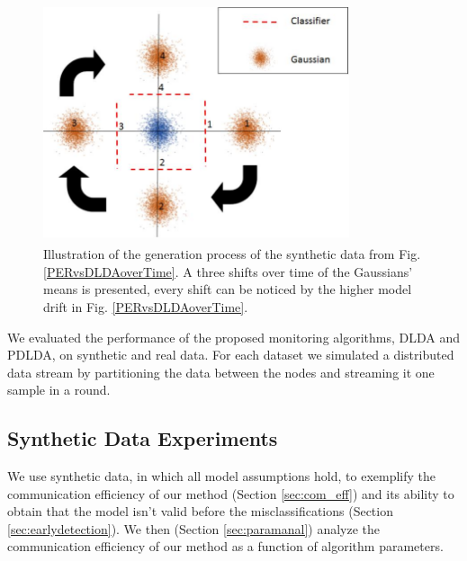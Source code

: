 \documentclass{vldb}
\begin{document}
\begin{figure}[ht]
	\centering
	\includegraphics[width=9cm, height=7cm]{graphics/DataShiftInEarlyDetection.jpg}
	\caption{Illustration of the generation process of the synthetic data from Fig. \ref{PERvsDLDAoverTime}. A three shifts over time of the Gaussians' means is presented, every shift can be noticed by the higher model drift in Fig. \ref{PERvsDLDAoverTime}.}
	\label{DataShiftInEarlyDetection}
\end{figure}

We evaluated the performance of the proposed monitoring algorithms, DLDA and PDLDA, on synthetic and real data. For each dataset we simulated a distributed data stream by partitioning the data between the nodes and streaming it one sample in a round. 

\subsection{Synthetic Data Experiments}
We use synthetic data, in which all model assumptions hold, to
exemplify the communication efficiency of our method (Section \ref{sec:com_eff})
and its ability to obtain that the model isn't valid before the
misclassifications (Section \ref{sec:earlydetection}). We then (Section \ref{sec:paramanal}) analyze the communication efficiency of our method as a function of algorithm parameters.
\end{document}
